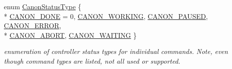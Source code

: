 \begin{DoxyCompactItemize}
enum \hyperlink{namespaceRCS_a0e720341c250145b8a2bbf6a1afa777d}{Canon\-Status\-Type} \{ \\*
\hyperlink{namespaceRCS_a0e720341c250145b8a2bbf6a1afa777daabf0ebc3e57ea212970f33430d917eae}{C\-A\-N\-O\-N\-\_\-\-D\-O\-N\-E} = 0, 
\hyperlink{namespaceRCS_a0e720341c250145b8a2bbf6a1afa777da4a0ac89d145f0ac2ab9d2322ea4f3a08}{C\-A\-N\-O\-N\-\_\-\-W\-O\-R\-K\-I\-N\-G}, 
\hyperlink{namespaceRCS_a0e720341c250145b8a2bbf6a1afa777da86acce9ac34e5ca0b0056b11810af584}{C\-A\-N\-O\-N\-\_\-\-P\-A\-U\-S\-E\-D}, 
\hyperlink{namespaceRCS_a0e720341c250145b8a2bbf6a1afa777dac78240d093ffb8a630852bac1aa33905}{C\-A\-N\-O\-N\-\_\-\-E\-R\-R\-O\-R}, 
\\*
\hyperlink{namespaceRCS_a0e720341c250145b8a2bbf6a1afa777da094244917abcd576f2118e80803279ee}{C\-A\-N\-O\-N\-\_\-\-A\-B\-O\-R\-T}, 
\hyperlink{namespaceRCS_a0e720341c250145b8a2bbf6a1afa777da101acfc97dc944ffd40c3e8e0cf7c179}{C\-A\-N\-O\-N\-\_\-\-W\-A\-I\-T\-I\-N\-G}
 \}
\begin{DoxyCompactList}\small\item\em enumeration of controller status types for individual commands. Note, even though command types are listed, not all used or supported. \end{DoxyCompactList}\end{DoxyCompactItemize}
